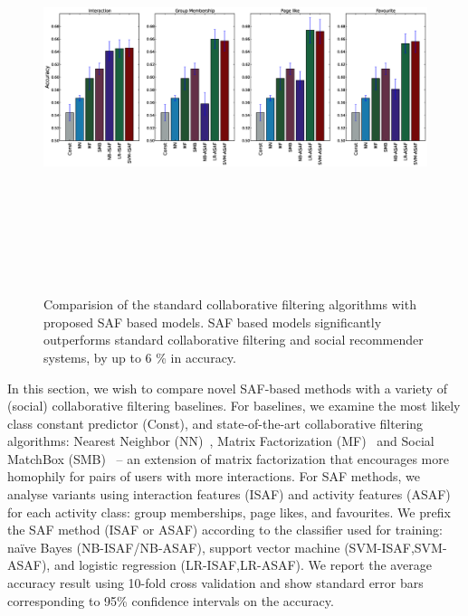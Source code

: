 \begin{figure}[tbp!]
\hspace{-6mm}\includegraphics[width=190mm,height=120mm]{data/plots/accuracy/accuracyLargeNew.eps}
\caption{  Comparision of the standard collaborative filtering algorithms with proposed SAF based models.  SAF based models significantly outperforms standard collaborative filtering and social recommender systems, by up to 6 \% in accuracy. }
\label{Fig1}
\end{figure}

In this section, we wish to compare novel SAF-based methods with a
variety of (social) collaborative filtering baselines.  For baselines,
we examine the most likely class constant predictor (Const), and
state-of-the-art collaborative filtering algorithms: Nearest Neighbor
(NN)~\cite{bellkor}, Matrix Factorization (MF)~\cite{pmf} and Social
MatchBox (SMB)~\cite{Noel2012NOF} -- an extension of matrix
factorization that encourages more homophily for pairs of users with
more interactions.  For SAF methods, we analyse variants using
interaction features (ISAF) and activity features (ASAF) for each
activity class: group memberships, page likes, and favourites.  We
prefix the SAF method (ISAF or ASAF) according to the classifier used
for training: na\"{i}ve Bayes (NB-ISAF/NB-ASAF), support vector
machine (SVM-ISAF,SVM-ASAF), and logistic regression
(LR-ISAF,LR-ASAF).  We report the average accuracy result using 10-fold cross
validation and show standard error bars corresponding to 95\% confidence
intervals on the accuracy.

